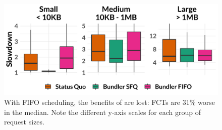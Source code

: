 \begin{figure}
    \centering
\begin{knitrout}
\color{fgcolor}
\includegraphics[width=\maxwidth]{figure/eval_fifo-1} 

\end{knitrout}
    \caption{With FIFO scheduling, the benefits of \name are lost: FCTs are 31\% worse in the median. Note the different y-axis scales for each group of request sizes.}
    \label{fig:eval:fifo}
\end{figure}
\newcommand{\overviewBenefitsFifoMedian}{2.13\xspace}
\newcommand{\overviewBenefitsFifoWorse}{31\%\xspace}
